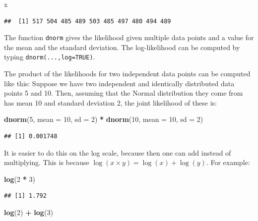 \documentclass[12pt,]{krantz}
\newenvironment{Shaded}{\begin{snugshade}}{\end{snugshade}}
\newcommand{\DataTypeTok}[1]{\textcolor[rgb]{0.13,0.29,0.53}{#1}}
\newcommand{\DecValTok}[1]{\textcolor[rgb]{0.00,0.00,0.81}{#1}}
\newcommand{\KeywordTok}[1]{\textcolor[rgb]{0.13,0.29,0.53}{\textbf{#1}}}
\newcommand{\NormalTok}[1]{#1}
\newcommand{\OperatorTok}[1]{\textcolor[rgb]{0.81,0.36,0.00}{\textbf{#1}}}
\newcommand{\StringTok}[1]{\textcolor[rgb]{0.31,0.60,0.02}{#1}}
\begin{document}
\begin{Shaded}
\begin{Highlighting}[]
\NormalTok{x}
\end{Highlighting}
\end{Shaded}

\begin{verbatim}
##  [1] 517 504 485 489 503 485 497 480 494 489
\end{verbatim}

The function \texttt{dnorm} gives the likelihood given multiple data points and a value for the mean and the standard deviation. The log-likelihood can be computed by typing \texttt{dnorm(...,log=TRUE)}.

The product of the likelihoods for two independent data points can be computed like this: Suppose we have two independent and identically distributed data points 5 and 10. Then, assuming that the Normal distribution they come from has mean 10 and standard deviation 2, the joint likelihood of these is:

\begin{Shaded}
\begin{Highlighting}[]
\KeywordTok{dnorm}\NormalTok{(}\DecValTok{5}\NormalTok{, }\DataTypeTok{mean =} \DecValTok{10}\NormalTok{, }\DataTypeTok{sd =} \DecValTok{2}\NormalTok{) }\OperatorTok{*}\StringTok{ }\KeywordTok{dnorm}\NormalTok{(}\DecValTok{10}\NormalTok{, }\DataTypeTok{mean =} \DecValTok{10}\NormalTok{, }
  \DataTypeTok{sd =} \DecValTok{2}\NormalTok{)}
\end{Highlighting}
\end{Shaded}

\begin{verbatim}
## [1] 0.001748
\end{verbatim}

It is easier to do this on the log scale, because then one can add instead of multiplying. This is because \(\log(x\times y)= \log(x) + \log(y)\). For example:

\begin{Shaded}
\begin{Highlighting}[]
\KeywordTok{log}\NormalTok{(}\DecValTok{2} \OperatorTok{*}\StringTok{ }\DecValTok{3}\NormalTok{)}
\end{Highlighting}
\end{Shaded}

\begin{verbatim}
## [1] 1.792
\end{verbatim}

\begin{Shaded}
\begin{Highlighting}[]
\KeywordTok{log}\NormalTok{(}\DecValTok{2}\NormalTok{) }\OperatorTok{+}\StringTok{ }\KeywordTok{log}\NormalTok{(}\DecValTok{3}\NormalTok{)}
\end{Highlighting}
\end{Shaded}
\end{document}
